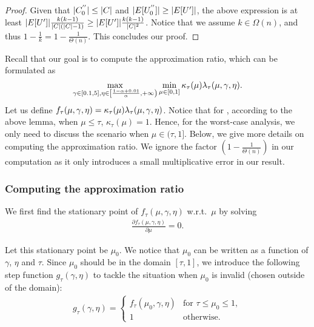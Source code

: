 \begin{proof}
Given that $\lvert C^{''}_0\rvert \leq \lvert C\rvert$ and $\lvert E[U^{''}_{0}]\rvert \geq \lvert E[U']\rvert$, the above expression is at least $\lvert E[U']\rvert\frac{k(k-1)}{\lvert C\rvert(\lvert C\rvert -1)} \geq \lvert E[U']\rvert\frac{k(k-1)}{\lvert C\rvert^2}$.
Notice that we assume $k \in \Omega(n)$, and thus $1 - \frac{1}{k} = 1 -
\frac{1}{\Theta(n)}$. This concludes our proof. 
\end{proof}

Recall that our goal is to compute the approximation ratio, which can be formulated as 
\begin{equation}
	\max_{\gamma \in [0.1, 5], \eta \in \left[\frac{1-\alpha + 0.01}{\alpha}, +\infty\right)} \min_{\mu \in [0 ,1]} \kappa_{\tau}(\mu) \lambda_{\tau}(\mu, \gamma, \eta).
\end{equation}
Let us define $f_{\tau}(\mu, \gamma, \eta) = \kappa_{\tau}(\mu) \lambda_{\tau}(\mu, \gamma, \eta)$.
Notice that for \kdense, according to the above lemma, when $\mu \leq \tau$, $\kappa_{\tau}(\mu) = 1$.
Hence, for the worst-case analysis, we only need to discuss the scenario when $\mu \in (\tau, 1]$. Below, we give more details on computing the approximation ratio.
We ignore the factor $(1 - \frac{1}{\Theta(n)})$ in our computation as it only introduces a small multiplicative error in our result.

\subsubsection{Computing the approximation ratio}
\label{sec:proof:subgraph-sdp:fix-c-lowerbound-compute}
We first find the stationary point of $f_{\tau}(\mu, \gamma, \eta)$ w.r.t.\ $\mu$ by solving 
\begin{equation}
	\begin{aligned}
		\frac{\partial f_{\tau}(\mu, \gamma, \eta)}{\partial \mu} = 0.
	\end{aligned}
\end{equation}

Let this stationary point be $\mu_0$. We notice that $\mu_0$ can be written as a function of $\gamma$, $\eta$ and $\tau$. 
Since $\mu_0$ should be in the domain $[\tau, 1]$, we introduce the following step function $g_{\tau}(\gamma, \eta)$ to 
tackle the situation when $\mu_0$ is invalid (chosen outside of the domain):
\begin{equation}
	\begin{aligned}
		g_{\tau}(\gamma, \eta) =
		\begin{cases}
			f_{\tau}(\mu_0, \gamma, \eta) & \text{for } \tau \leq \mu_0 \leq 1, \\ 
			1 & \text{otherwise}.
		\end{cases}
	\end{aligned}
\end{equation}

